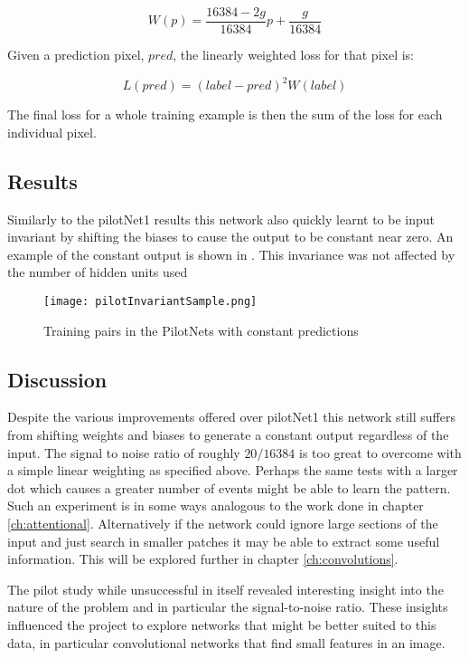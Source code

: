 \begin{equation}
    \label{eq:weightedPenalty}
    W(p) = \frac{16384 - 2g}{16384} p + \frac{g}{16384}
\end{equation}

Given a prediction pixel, $pred$, the linearly weighted loss for that pixel is:

\begin{equation}
    \label{eq:linearLoss}
    L(pred) = (label - pred)^2 W(label)
\end{equation}

The final loss for a whole training example is then the sum of the loss for each individual pixel. 

\subsection{Results} 
Similarly to the pilotNet1 results this network also quickly learnt to be input invariant by shifting the biases to cause the output to be constant near zero. 
An example of the constant output is shown in . 
This invariance was not affected by the number of hidden units used

\begin{figure}[h]
    \centering
    \texttt{[image: pilotInvariantSample.png]}
    \caption{Training pairs in the PilotNets with constant predictions}
    \label{fig:pilotInvarianceSample}
\end{figure}


\subsection{Discussion}
Despite the various improvements offered over pilotNet1 this network still suffers from shifting weights and biases to generate a constant output regardless of the input. 
The signal to noise ratio of roughly $20/16384$ is too great to overcome with a simple linear weighting as specified above.
Perhaps the same tests with a larger dot which causes a greater number of events might be able to learn the pattern. 
Such an experiment is in some ways analogous to the work done in chapter \ref{ch:attentional}. 
Alternatively if the network could ignore large sections of the input and just search in smaller patches it may be able to extract some useful information.
This will be explored further in chapter \ref{ch:convolutions}. 

The pilot study while unsuccessful in itself revealed interesting insight into the nature of the problem and in particular the signal-to-noise ratio.
These insights influenced the project to explore networks that might be better suited to this data, in particular convolutional networks that find small features in an image. 
 
